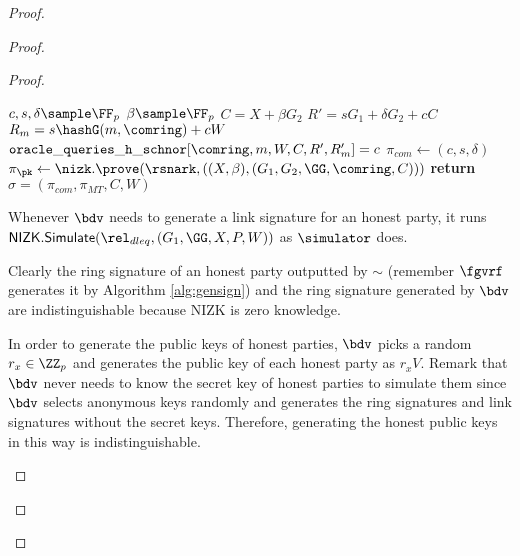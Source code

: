 \begin{proof}
\begin{proof}
\begin{proof}
			
			\begin{algorithm}
				\caption{$\gen_{sign}(\comring,W,X,m)$}
				\label{alg:gensignbdv}	 	
				\begin{algorithmic}[1]
					\State $ c,s,\delta \sample \FF_p $
					\State $ \beta \sample \FF_p $
					\State $ C =  X + \beta G_2$
					\State $ R' = sG_1 +\delta G_2 + cC$
					\State $ R_m = s\hashG(m, \comring) + c W $
					\State $ \mathtt{oracle\_queries\_h\_schnor}[\comring,m, W, C,R',R'_m] = c$						
					\State $ \pi_{com} \leftarrow (c,s,\delta) $
					\State $ \pi_{\pk} \leftarrow  \nizk.\prove(\rsnark,((X, \beta),(G_1,G_2, \GG,\comring, C))) $
					\State \textbf{return} $ \sigma = (\pi_{com},\pi_{MT},C,W) $
				\end{algorithmic}
				
			\end{algorithm}
			
			Whenever $ \bdv $ needs to generate a link signature for an honest party, it runs $ \mathsf{NIZK}.\mathsf{Simulate}(\rel_{dleq},(G_1,\GG, X,P,W)) $ as $ \simulator $ does.
			
			Clearly the ring signature of an honest party outputted by $ \sim $ (remember $ \fgvrf$ generates it by Algorithm \ref{alg:gensign}) and the ring signature generated by $ \bdv $ are indistinguishable because NIZK is zero knowledge.
			
			In order to generate the public keys of honest parties, $ \bdv $ picks a random $ r_x\in \ZZ_p $ and generates the public key of each honest party as $ r_xV$.
			Remark that $ \bdv$  never needs to know the secret key of honest parties to simulate them since $ \bdv $ selects anonymous keys randomly  and generates the ring signatures and link signatures  without the secret keys. Therefore, generating the honest public keys in this way is indistinguishable. 			
			\begin{figure}
				\centering
				
				\noindent{}
\end{figure}
\end{proof}
\end{proof}
\end{proof}
